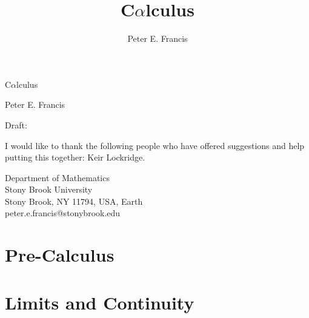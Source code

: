 \documentclass{article}
\title{C$\alpha$lculus}
\author{Peter E. Francis}
\theoremstyle{definition}
\theoremstyle{definition}
\begin{document}
\thispagestyle{empty}

\vspace*{2in}

\begin{Huge}
\noindent C$\alpha$lculus
\end{Huge}

\vspace*{1em}

\noindent Peter E. Francis

\vspace*{5em}

\begin{footnotesize}
\noindent Draft: \DTMnow
\end{footnotesize}

\vfill

\begin{small}
\noindent I would like to thank the following people who have offered suggestions and help putting this together: Keir Lockridge.
\end{small}

\vfill

\noindent Department of Mathematics \\
Stony Brook University\\
Stony Brook, NY 11794, USA, Earth\\

\noindent peter.e.francis@stonybrook.edu

\newpage

\tableofcontents

\newpage




\newpage

\part{Pre-Calculus}






\newpage

\part{Limits and Continuity}
\end{document}
